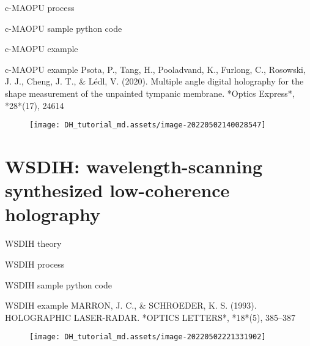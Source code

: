 \documentclass[t, aspectratio=169]{beamer}
\begin{document}
\begin{frame}{c-MAOPU process}

\end{frame}


\begin{frame}{c-MAOPU sample python code}

\end{frame}


\begin{frame}{c-MAOPU example}

\end{frame}


\begin{frame}{c-MAOPU example}
Psota, P., Tang, H., Pooladvand, K., Furlong, C., Rosowski, J. J., Cheng, J. T., \& Lédl, V. (2020). Multiple angle digital holography for the shape measurement of the unpainted tympanic membrane. *Optics Express*, *28*(17), 24614
\begin{figure}
	\texttt{[image: DH\_tutorial\_md.assets/image-20220502140028547]}
\end{figure}
\end{frame}


\section{WSDIH: wavelength-scanning synthesized low-coherence holography}
\begin{frame}[c]
\centering\LARGE\textbf{\secname}
\end{frame}


\begin{frame}{WSDIH theory}

\end{frame}


\begin{frame}{WSDIH process}

\end{frame}


\begin{frame}{WSDIH sample python code}

\end{frame}


\begin{frame}{WSDIH example}
MARRON, J. C., \& SCHROEDER, K. S. (1993). HOLOGRAPHIC LASER-RADAR. *OPTICS LETTERS*, *18*(5), 385–387
\begin{figure}
	\texttt{[image: DH\_tutorial\_md.assets/image-20220502221331902]}
\end{figure}
\end{frame}
\end{document}
